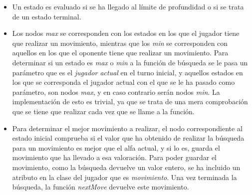 \documentclass{article}
\begin{document}
  \begin{itemize}
     \item Un estado es evaluado si se ha llegado al límite de profundidad o si se trata de un estado terminal. 
     \item Los nodos \textit{max} se corresponden con los estados en los que el jugador tiene que realizar un movimiento, mientras que los \textit{min} se corresponden con aquellos en los que el oponente tiene que realizar un movimiento. Para determinar si un estado es \textit{max} o \textit{min} a la función de búsqueda se le pasa un parámetro que es el \textit{jugador actual} en el turno inicial, y aquellos estados en los que se corresponda el jugador actual con el que se le ha pasado como parámetro, son nodos \textit{max}, y en caso contrario serán nodos \textit{min}. La implementación de esto es trivial, ya que se trata de una mera comprobación que se tiene que realizar cada vez que se llame a la función.
     \item Para determinar el mejor movimiento a realizar, el nodo correspondiente al estado inicial comprueba si el valor que ha obtenido de realizar la búsqueda para un movimiento es mejor que el alfa actual, y si lo es, guarda el movimiento que ha llevado a esa valoración. Para poder guardar el movimiento, como la búsqueda devuelve un valor entero, se ha incluido un atributo en la clase del jugador que es \textit{movimiento}. Una vez terminada la búsqueda, la función \textit{nextMove} devuelve este movimiento.
  \end{itemize}
  
\end{document}
